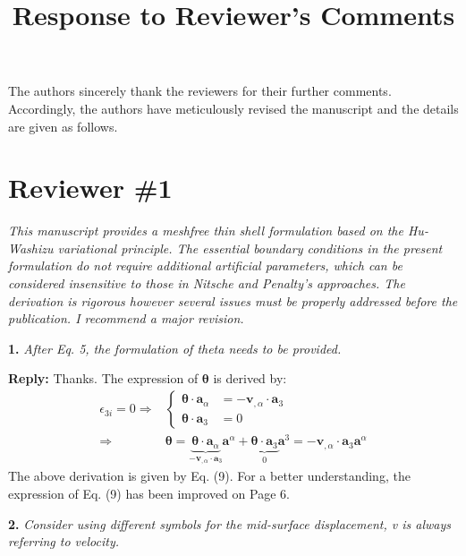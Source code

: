 \documentclass{article}
\title{Response to Reviewer's Comments}
\begin{document}
\maketitle

The authors sincerely thank the reviewers for their further comments. Accordingly, the authors have meticulously revised the manuscript and the details are given as follows.

\section*{Reviewer \#1}
\textit{This manuscript provides a meshfree thin shell formulation based on the Hu-Washizu variational principle. The essential boundary conditions in the present formulation do not require additional artificial parameters, which can be considered insensitive to those in Nitsche and Penalty’s approaches. The derivation is rigorous however several issues must be properly addressed before the publication. I recommend a major revision.}

\textbf{1.} \textit{After Eq. 5, the formulation of theta needs to be provided.}

\textbf{Reply:} Thanks. The expression of $\boldsymbol \theta$ is derived by:
\begin{equation}
    \begin{split}
        \epsilon_{3i} = 0 \Rightarrow &
        \left \{
        \begin{split}
            \boldsymbol \theta \cdot \boldsymbol a_\alpha &= - \boldsymbol v_{,\alpha} \cdot \boldsymbol a_3 \\
            \boldsymbol \theta \cdot \boldsymbol a_3 &= 0
        \end{split}
        \right . \\ \Rightarrow &
        \boldsymbol \theta = \underbrace{\boldsymbol \theta \cdot \boldsymbol a_{\alpha}}_{- \boldsymbol v_{,\alpha} \cdot \boldsymbol a_3} \boldsymbol a^\alpha 
        + \underbrace{\boldsymbol \theta \cdot \boldsymbol a_3}_{0} \boldsymbol a^3 = - \boldsymbol v_{,\alpha} \cdot \boldsymbol a_3 \boldsymbol a^\alpha
    \end{split}
\end{equation}
The above derivation is given by Eq. (9). For a better understanding, the expression of Eq. (9) has been improved on Page 6.

\textbf{2.} \textit{Consider using different symbols for the mid-surface displacement, v is always referring to velocity.}
\end{document}
